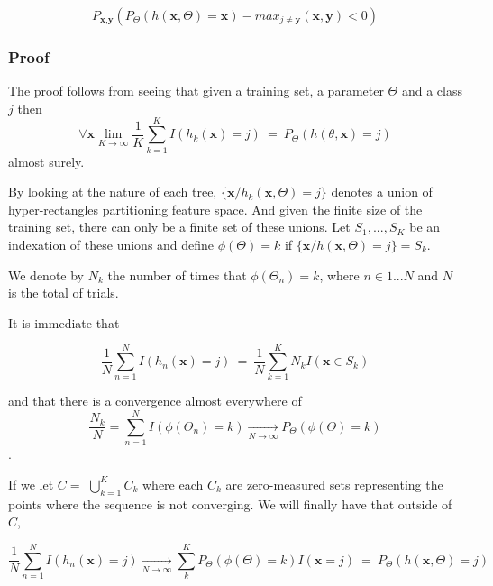 \begin{equation}
 P_{\textbf{x}, \textbf{y} } ( P_{\Theta} (h(\textbf{x}, \Theta) = \textbf{x}) - max_{j \neq \textbf{y}} (\textbf{x}, \textbf{y}) < 0) 
 \end{equation}


\subsubsection{Proof}
The proof follows from seeing that given a training set, a parameter $\Theta$ and a class $j$ then
\begin{equation}

\forall \textbf{x} \lim_{K\to\infty} \frac{1}{K} \sum_{k=1}^K I(h_k(\textbf{x}) = j) \ =   \ P_\Theta(h(\theta,\textbf{x}) = j)
\end{equation}
almost surely.

By looking at the nature of each tree, $\{\textbf{x} / h_k(\textbf{x}, \Theta) = j \}$ denotes a union of hyper-rectangles partitioning feature space. And given the finite size of the training set, there can only be a finite set of these unions. Let $S_1, ..., S_K$ be an indexation of these unions and define $\phi(\Theta) = k $ if $\{\textbf{x} / h(\textbf{x}, \Theta) = j \} = S_k$.

We denote by $N_k$ the number of times that $\phi(\Theta_n) =k $, where $n \in {1...N}$ and $N$ is the total of trials.

It is immediate that

\begin{equation}
 \frac{1}{N} \sum_{n=1}^N I(h_n(\textbf{x}) = j) \ = \  \frac{1}{N} \sum_{k=1}^K N_k I(\textbf{x} \in S_k) 
 \end{equation}

and that there is a convergence almost everywhere of 
\begin{equation}
 \frac{N_k}{N} = \sum_{n=1}^N  I(\phi(\Theta_n) = k)  \xrightarrow[N \to \infty]{}   P_{\Theta}(\phi(\Theta)= k)
 \end{equation}.

If we let $C = $ $\bigcup\limits_{k=1}^{K} C_{k}$ where each $C_k$ are zero-measured sets representing the points where the sequence is not converging. We will finally have that  outside of $C$,

\begin{equation}
 \frac{1}{N} \sum_{n=1}^N I(h_n(\textbf{x}) = j) \xrightarrow[N \to \infty]{} \sum_k^K    P_{\Theta}(\phi(\Theta)= k) I(\textbf{x} =j ) \ = \ P_{\Theta}(h(\textbf{x}, \Theta) = j)  
 \end{equation}



